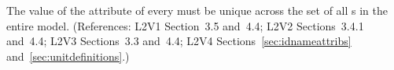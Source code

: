 The value of the  attribute of every \UnitDefinition must be
unique across the set of all \UnitDefinition{}s in the entire
model.  (References: L2V1 Section~3.5 and~4.4; L2V2 Sections~3.4.1 and~4.4;
L2V3 Sections~3.3 and~4.4; L2V4 Sections~\ref{sec:idnameattribs} and~\ref{sec:unitdefinitions}.)
